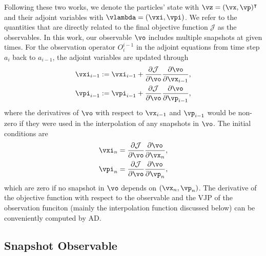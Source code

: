 \documentclass[modern, trackchanges, dvipsnames]{aastex631}
\newcommand{\p}{\partial}
\newcommand{\cJ}{\mathcal{J}}
\begin{document}
Following these two works, we denote the particles' state with $\vz = (\vx,
\vp)^\intercal$ and their adjoint variables with $\vlambda = (\vxi, \vpi)$.
We refer to the quantities that are directly related to the final objective
function $\cJ$ as the observables.
In this work, our observable $\vo$ includes multiple snapshots at given times.
For the observation operator $O_{i}^{i-1}$ in the adjoint equations from time
step $a_i$ back to $a_{i-1}$, the adjoint variables are updated through
\begin{align}
  \vxi_{i-1} &:= \vxi_{i-1} + \frac{\p\cJ}{\p\vo}\frac{\p\vo}{\p \vx_{i-1}}, \nonumber\\
  \vpi_{i-1} &:= \vpi_{i-1} + \frac{\p\cJ}{\p\vo}\frac{\p\vo}{\p \vp_{i-1}},
\end{align}
where the derivatives of $\vo$ with respect to $\vx_{i-1}$ and $\vp_{i-1}$ would
be non-zero if they were used in the interpolation of any snapshots in $\vo$.
The initial conditions are
\begin{align}
  \vxi_n &= \frac{\p\cJ}{\p\vo}\frac{\p\vo}{\p\vx_n}, \nonumber\\
  \vpi_n &= \frac{\p\cJ}{\p\vo}\frac{\p\vo}{\p\vp_n},
\end{align}
which are zero if no snapshot in $\vo$ depends on $(\vx_n, \vp_n)$.
The derivative of the objective function with respect to the observable and the
VJP of the observation funciton (mainly the interpolation function discussed
below) can be conveniently computed by AD.


\vspace{1em}
\subsection{Snapshot Observable}
\label{sec:snapobs}
\end{document}
